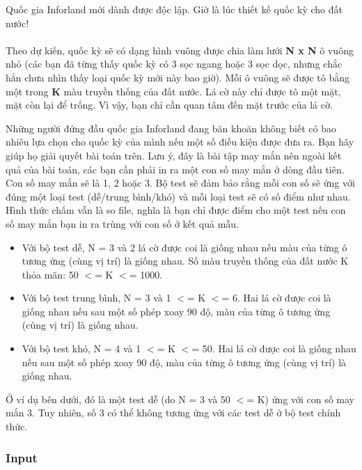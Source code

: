 



   Quốc gia Inforland mới dành được độc lập. Giờ là lúc thiết kế quốc kỳ cho đất nước!   
\\
\\   Theo dự kiến, quốc kỳ sẽ có dạng hình vuông được chia làm lưới   \textbf{    N x N   }   ô vuông nhỏ (các bạn đã từng thấy quốc kỳ có 3 sọc ngang hoặc 3 sọc dọc, nhưng chắc hẳn chưa nhìn thấy loại quốc kỳ mới này bao giờ). Mỗi ô vuông sẽ được tô bằng một trong   \textbf{    K   }   màu truyền thống của đất nước. Lá cờ này chỉ được tô một mặt, mặt còn lại để trống. Vì vậy, bạn chỉ cần quan tâm đến mặt trước của lá cờ.  

   Những người đứng đầu quốc gia Inforland đang băn khoăn không biết có bao nhiêu lựa chọn cho quốc kỳ của mình nếu một số điều kiện được đưa ra. Bạn hãy giúp họ giải quyết bài toán trên. Lưu ý, đây là bài tập may mắn nên ngoài kết quả của bài toán, các bạn cần phải in ra một con số may mắn ở dòng đầu tiên. Con số may mắn sẽ là 1, 2 hoặc 3. Bộ test sẽ đảm bảo rằng mỗi con số sẽ ứng với đúng một loại test (dễ/trung bình/khó) và mỗi loại test sẽ có số điểm như nhau. Hình thức chấm vẫn là so file, nghĩa là bạn chỉ được điểm cho một test nếu con số may mắn bạn in ra trùng với con số ở kết quả mẫu.  
\begin{itemize}
	\item     Với bộ test dễ, N = 3 và 2 lá cờ được coi là giống nhau nếu màu của từng ô tương ứng (cùng vị trí) là giống nhau. Số màu truyền thống của đất nước K thỏa mãn: 50 $<$= K $<$= 1000.   
\end{itemize}
\begin{itemize}
	\item     Với bộ test trung bình, N = 3 và 1 $<$= K $<$= 6. Hai lá cờ được coi là giống nhau nếu sau một số phép xoay 90 độ, màu của từng ô tương ứng (cùng vị trí) là giống nhau.   
\end{itemize}
\begin{itemize}
	\item     Với bộ test khó, N = 4 và 1 $<$= K $<$= 50. Hai lá cờ được coi là giống nhau nếu sau một số phép xoay 90 độ, màu của từng ô tương ứng (cùng vị trí) là giống nhau.   
\end{itemize}

   Ở ví dụ bên dưới, đó là một test dễ (do N = 3 và 50 $<$= K) ứng với con số may mắn 3. Tuy nhiên, số 3 có thể không tương ứng với các test dễ ở bộ test chính thức.  

\subsubsection{   Input  }


